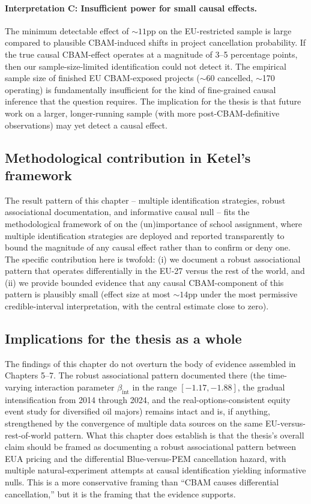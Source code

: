 \documentclass[11pt,a4paper]{article}
\newcommand{\bint}{\beta_{\mathrm{int}}}
\begin{document}
\paragraph{Interpretation C: Insufficient power for small causal effects.}
The minimum detectable effect of $\sim 11$pp on the EU-restricted sample is large compared to plausible CBAM-induced shifts in project cancellation probability. If the true causal CBAM-effect operates at a magnitude of 3--5 percentage points, then our sample-size-limited identification could not detect it. The empirical sample size of finished EU CBAM-exposed projects ($\sim$60 cancelled, $\sim$170 operating) is fundamentally insufficient for the kind of fine-grained causal inference that the question requires. The implication for the thesis is that future work on a larger, longer-running sample (with more post-CBAM-definitive observations) may yet detect a causal effect.

\subsection{Methodological contribution in Ketel's framework}

The result pattern of this chapter -- multiple identification strategies, robust associational documentation, and informative causal null -- fits the methodological framework of \citet{ketel2023unimportance} on the (un)importance of school assignment, where multiple identification strategies are deployed and reported transparently to bound the magnitude of any causal effect rather than to confirm or deny one. The specific contribution here is twofold: (i) we document a robust associational pattern that operates differentially in the EU-27 versus the rest of the world, and (ii) we provide bounded evidence that any causal CBAM-component of this pattern is plausibly small (effect size at most $\sim 14$pp under the most permissive credible-interval interpretation, with the central estimate close to zero).

\subsection{Implications for the thesis as a whole}

The findings of this chapter do not overturn the body of evidence assembled in Chapters 5--7. The robust associational pattern documented there (the time-varying interaction parameter $\bint$ in the range $[-1.17, -1.88]$, the gradual intensification from 2014 through 2024, and the real-options-consistent equity event study for diversified oil majors) remains intact and is, if anything, strengthened by the convergence of multiple data sources on the same EU-versus-rest-of-world pattern. What this chapter does establish is that the thesis's overall claim should be framed as documenting a robust associational pattern between EUA pricing and the differential Blue-versus-PEM cancellation hazard, with multiple natural-experiment attempts at causal identification yielding informative nulls. This is a more conservative framing than ``CBAM causes differential cancellation,'' but it is the framing that the evidence supports.
\end{document}
